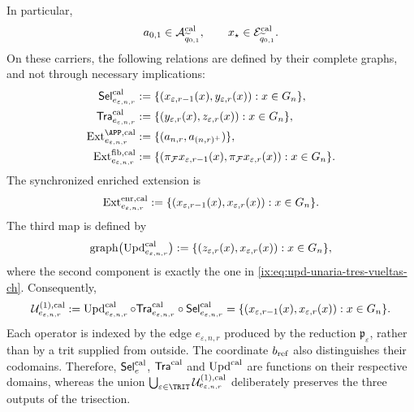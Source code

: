 In particular,
\[
 a_{0,1}\in\mathcal A^{\rm cal}_{\widetilde q_{0,1}},
 \qquad
 x_\star\in\mathcal E^{\rm cal}_{\widetilde q_{0,1}}.
\]
On these carriers, the following relations are defined by their complete
graphs, and not through necessary implications:
\begin{align}
 \mathsf{Sel}^{\rm cal}_{e_{\varepsilon,n,r}}
   &:=\{(x_{\varepsilon,r-1}(x),y_{\varepsilon,r}(x)):
          x\in G_n\},\\
 \mathsf{Tra}^{\rm cal}_{e_{\varepsilon,n,r}}
   &:=\{(y_{\varepsilon,r}(x),z_{\varepsilon,r}(x)):
          x\in G_n\},\\
 \operatorname{Ext}^{\APP,\rm cal}_{e_{\varepsilon,n,r}}
   &:=\{(a_{n,r},a_{(n,r)^+})\},
 \label{ix:eq:ext-app-calibrada-ch}\\
 \operatorname{Ext}^{\rm fib,cal}_{e_{\varepsilon,n,r}}
   &:=\{(\pi_{\mathcal F}x_{\varepsilon,r-1}(x),
          \pi_{\mathcal F}x_{\varepsilon,r}(x)):x\in G_n\}.
 \label{ix:eq:ext-fibra-calibrada-ch}
\end{align}
The synchronized enriched extension is
\begin{equation}
 \operatorname{Ext}^{\rm enr,cal}_{e_{\varepsilon,n,r}}
 :=\{(x_{\varepsilon,r-1}(x),x_{\varepsilon,r}(x)):
       x\in G_n\}.
 \label{ix:eq:ext-enriquecida-calibrada-ch}
\end{equation}
The third map is defined by
\begin{equation}
 \operatorname{graph}
 \bigl(\operatorname{Upd}^{\rm cal}_{e_{\varepsilon,n,r}}\bigr)
 :=\{(z_{\varepsilon,r}(x),x_{\varepsilon,r}(x)):
       x\in G_n\},
 \label{ix:eq:grafo-upd-calibrado-ch}
\end{equation}
where the second component is exactly the one in
\eqref{ix:eq:upd-unaria-tres-vueltas-ch}. Consequently,
\begin{equation}
 \mathcal U^{(1),\rm cal}_{e_{\varepsilon,n,r}}
 :=\operatorname{Upd}^{\rm cal}_{e_{\varepsilon,n,r}}\circ
   \mathsf{Tra}^{\rm cal}_{e_{\varepsilon,n,r}}\circ
   \mathsf{Sel}^{\rm cal}_{e_{\varepsilon,n,r}}
 =\{(x_{\varepsilon,r-1}(x),x_{\varepsilon,r}(x)):
      x\in G_n\}.
 \label{ix:eq:transicion-cal-en-tpk-ch}
\end{equation}
Each operator is indexed by the edge \(e_{\varepsilon,n,r}\) produced by the
reduction \(\mathfrak p_\varepsilon\), rather than by a trit supplied from
outside. The coordinate \(b_{\rm ref}\) also distinguishes their codomains.
Therefore,
\(\mathsf{Sel}^{\rm cal}_{e}\),
\(\mathsf{Tra}^{\rm cal}\) and \(\operatorname{Upd}^{\rm cal}\) are functions
on their respective domains, whereas the union
\(\bigcup_{\varepsilon\in\TRIT}
\mathcal U^{(1),\rm cal}_{e_{\varepsilon,n,r}}\) deliberately preserves the
three outputs of the trisection.

